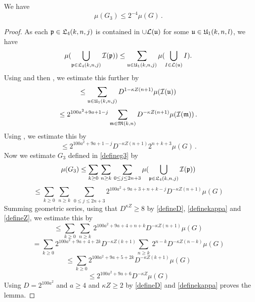 \begin{lemma}
    \label{third-exception}
    \leanok
       We have
\begin{equation}
    \mu(G_3)\le 2^{-4} \mu(G)\, .
\end{equation}
\end{lemma}
\begin{proof}
\leanok
As each ${\mathfrak p}\in {\mathfrak L}_4(k,n,j)$
is contained in $\cup\mathcal{L}({\mathfrak u})$ for some
${\mathfrak u}\in {\mathfrak U}_1(k,n,l)$, we have
\begin{equation}
\mu(\bigcup_{{\mathfrak p} \in {\mathfrak L}_4 (k,n,j)}{\mathcal{I}}({\mathfrak p}))
\le \sum_{{\mathfrak u}\in {\mathfrak U}_1(k,n,j)}
\mu(\bigcup_{I \in \mathcal{L} ({\mathfrak u})}I).
\end{equation}
Using  and then , we estimate this further
 by
\begin{equation}
    \le \sum_{{\mathfrak u}\in {\mathfrak U}_1(k,n,j)}
    D^{1-\kappa Z(n+1)}
        \mu({\mathcal{I}}(\mathfrak{u}))
\end{equation}
\begin{equation}
    \le 2^{100a^2+9a+1-j} \sum_{\mathfrak{m}\in \mathfrak{M}(k,n)}
     D^{-\kappa Z(n+1)}
    \mu({\mathcal{I}}(\mathfrak{m}))\,.
\end{equation}
Using , we estimate this by
  \begin{equation}
     \le
2^{100a^2 + 9a + 1-j} D^{-\kappa Z(n+1)}
     2^{n+k+3}\mu(G)\, .
\end{equation}
Now we estimate $G_3$ defined in \eqref{defineg3} by
\begin{equation}
    \mu(G_3)\le \sum_{k\ge 0}\, \sum_{n \geq k}\,
    \sum_{0\le j\le 2n+3}
    \mu(\bigcup_{{\mathfrak p} \in {\mathfrak L}_4 (k,n,j)}
    {\mathcal{I}}({\mathfrak p}))
\end{equation}
\begin{equation}
    \le \sum_{k\ge 0}\, \sum_{n \geq k}\,
    \sum_{0\le j\le 2n+3}
    2^{100a^2 + 9a + 3 + n + k -j} D^{-\kappa Z(n+1)}\mu(G)
\end{equation}
Summing geometric series, using that $D^{\kappa Z}\ge 8$ by \eqref{defineD}, \eqref{definekappa} and \eqref{defineZ}, we estimate this by
\begin{equation}
    \le \sum_{k\ge 0}\, \sum_{n \geq k}\,
    2^{100a^2 + 9a + 4 + n + k} D^{-\kappa Z(n+1)}\mu(G)
\end{equation}
\begin{equation}
    = \sum_{k\ge 0} 2^{100a^2 + 9a + 4 + 2k} D^{-\kappa Z(k+1)} \sum_{n \geq k}\,
    2^{n - k} D^{-\kappa Z(n-k)}\mu(G)
\end{equation}
\begin{equation}
    \le \sum_{k\ge 0} 2^{100a^2 + 9a + 5 + 2k} D^{-\kappa Z(k+1)}\mu(G)
\end{equation}
\begin{equation}
   \le 2^{100a^2 + 9a + 6} D^{-\kappa Z}\mu(G)
\end{equation}
Using $D = 2^{100a^2}$ and $a \ge 4$ and $\kappa Z \ge 2$ by \eqref{defineD} and \eqref{definekappa} proves the lemma.
\end{proof}

